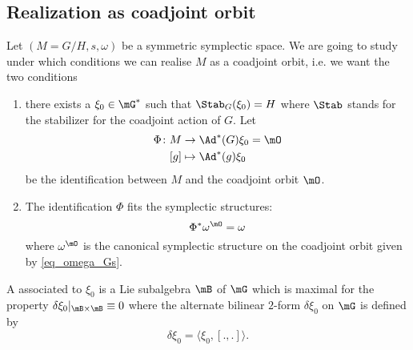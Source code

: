 \subsection{Realization as coadjoint orbit}

Let $(M=G/H,s,\omega)$ be a symmetric symplectic space. We are going to study under which conditions we can realise $M$ as a coadjoint orbit, i.e. we want the two conditions
\begin{enumerate}

	\item
	      there exists a $\xi_0\in\mG^*$ such that $\Stab_G(\xi_0)=H$ where $\Stab$ stands for the stabilizer for the coadjoint action of $G$. Let
	      \begin{equation}
		      \begin{aligned}
			      \Phi\colon M & \to \Ad^*(G)\xi_0=\mO \\
			      [g]          & \mapsto \Ad^*(g)\xi_0
		      \end{aligned}
	      \end{equation}
	      be the identification between $M$ and the coadjoint orbit $\mO$.
	\item
	      The identification $\Phi$ fits the symplectic structures:
	      \begin{equation}
		      \Phi^*\omega^{\mO}=\omega
	      \end{equation}
	      where $\omega^{\mO}$ is the canonical symplectic structure on the coadjoint orbit given by \eqref{eq_omega_Gs}.
\end{enumerate}

\begin{definition}
	A  associated to $\xi_0$ is a Lie subalgebra $\mB$ of $\mG$ which is maximal for the property $\delta\xi_0|_{\mB\times \mB}\equiv 0$ where the alternate bilinear $2$-form $\delta\xi_0$ on $\mG$ is defined by
	\begin{equation}
		\delta\xi_0=\langle \xi_0, [.,.]\rangle.
	\end{equation}
\end{definition}

